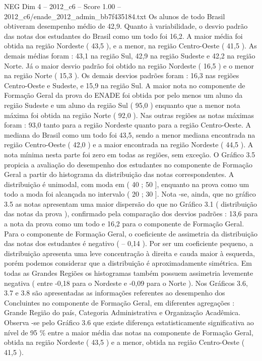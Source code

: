 \begin{textsample}{NEG Dim 4 – 2012\_c6 – Score 1.00 – 2012\_c6/enade\_2012\_admin\_bb7f435184.txt}
Os alunos de todo Brasil obtiveram desempenho médio de 42,9.
Quanto à variabilidade, o desvio padrão das notas dos estudantes do Brasil como um todo foi 16,2.
A maior média foi obtida na região Nordeste ( 43,5 ), e a menor, na região Centro-Oeste ( 41,5 ).
As demais médias foram : 43,1 na região Sul, 42,9 na região Sudeste e 42,2 na região Norte.
Já o maior desvio padrão foi obtido na região Nordeste ( 16,5 ) e o menor na região Norte ( 15,3 ).
Os demais desvios padrões foram : 16,3 nas regiões Centro-Oeste e Sudeste, e 15,9 na região Sul.
A maior nota no componente de Formação Geral da prova do ENADE foi obtida por pelo menos um aluno da região Sudeste e um aluno da região Sul ( 95,0 ) enquanto que a menor nota máxima foi obtida na região Norte ( 92,0 ).
Nas outras regiões as notas máximas foram : 93,0 tanto para a região Nordeste quanto para a região Centro-Oeste.
A mediana do Brasil como um todo foi 43,5, sendo a menor mediana encontrada na região Centro-Oeste ( 42,0 ) e a maior encontrada na região Nordeste ( 44,5 ).
A nota mínima nesta parte foi zero em todas as regiões, sem exceção.
O Gráfico 3.5 propicia a avaliação do desempenho dos estudantes no componente de Formação Geral a partir do histograma da distribuição das notas correspondentes.
A distribuição é unimodal, com moda em ( 40 ; 50 ], enquanto na prova como um todo a moda foi alcançada no intervalo ( 20 ; 30 ].
Nota -se, ainda, que no gráfico 3.5 as notas apresentam uma maior dispersão do que no Gráfico 3.1 ( distribuição das notas da prova ), confirmado pela comparação dos desvios padrões : 13,6 para a nota da prova como um todo e 16,2 para o componente de Formação Geral.
Para o componente de Formação Geral, o coeficiente de assimetria da distribuição das notas dos estudantes é negativo ( – 0,14 ).
Por ser um coeficiente pequeno, a distribuição apresenta uma leve concentração à direita e cauda maior à esquerda, porém podemos considerar que a distribuição é aproximadamente simétrica.
Em todas as Grandes Regiões os histogramas também possuem assimetria levemente negativa ( entre -0,18 para o Nordeste e -0,09 para o Norte ).
Nos Gráficos 3.6, 3.7 e 3.8 são apresentadas as informações referentes ao desempenho dos Concluintes no componente de Formação Geral, em diferentes agregações : Grande Região do país, Categoria Administrativa e Organização Acadêmica.
Observa -se pelo Gráfico 3.6 que existe diferença estatisticamente significativa ao nível de 95 \% entre a maior média das notas na componente de Formação Geral, obtida na região Nordeste ( 43,5 ) e a menor, obtida na região Centro-Oeste ( 41,5 ).

\end{textsample}
